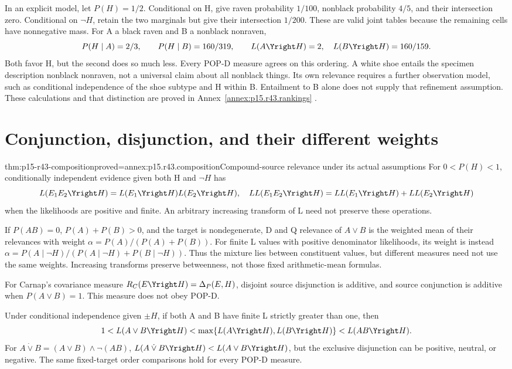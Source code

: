 In an explicit model, let \(P(H)=1/2\). Conditional on H, give raven
probability \(1/100\), nonblack probability \(4/5\), and their
intersection zero. Conditional on \(\neg H\), retain the two
marginals but give their intersection \(1/200\). These are valid
joint tables because the remaining cells have nonnegative mass.
For A a black raven and B a nonblack nonraven,
\[
 P(H\mid A)=2/3,
 \qquad P(H\mid B)=160/319,
 \qquad L(A\Yright H)=2,
 \quad L(B\Yright H)=160/159.
\]
Both favor H, but the second does so much less. Every POP-D measure
agrees on this ordering. A white shoe entails the specimen description
nonblack nonraven, not a universal claim about all nonblack things.
Its own relevance requires a further observation model, such as
conditional independence of the shoe subtype and H within B. Entailment
to B alone does not supply that refinement assumption. These calculations
and that distinction are proved in Annex~\ref{annex:p15.r43.rankings}
\parencite[pp.~271--272 and p.~274, nn.~15--16]{Merin2021Relevance}.

\section{Conjunction, disjunction, and their different weights}
\label{sec:p15-r43-composition}

\begin{hbtheorem}{thm:p15-r43-composition}{proved=annex:p15.r43.composition}{Compound-source relevance under its actual assumptions}
For \(0<P(H)<1\), conditionally independent evidence given both
H and \(\neg H\) has
\[
 L(E_1E_2\Yright H)=L(E_1\Yright H)L(E_2\Yright H),
 \quad LL(E_1E_2\Yright H)=LL(E_1\Yright H)+LL(E_2\Yright H)
\]
when the likelihoods are positive and finite. An arbitrary increasing
transform of L need not preserve these operations.

If \(P(AB)=0\), \(P(A)+P(B)>0\), and the target is nondegenerate,
D and Q relevance of \(A\vee B\) is the weighted mean of their
relevances with weight \(\alpha=P(A)/(P(A)+P(B))\).
For finite L values with positive denominator likelihoods, its weight
is instead \(\alpha=P(A\mid\neg H)/(P(A\mid\neg H)+P(B\mid\neg H))\).
Thus the mixture lies between constituent values, but different
measures need not use the same weights. Increasing transforms preserve
betweenness, not those fixed arithmetic-mean formulas.

For Carnap's covariance measure \(R_C(E\Yright H)=\Delta_P(E,H)\),
disjoint source disjunction is additive, and source conjunction is
additive when \(P(A\vee B)=1\). This measure does not obey POP-D.

Under conditional independence given \(\pm H\), if both A and B have
finite L strictly greater than one, then
\[
 1<L(A\vee B\Yright H)<\max\{L(A\Yright H),L(B\Yright H)\}
                   <L(AB\Yright H).
\]
For \(A\mathbin{\dot\vee}B=(A\vee B)\wedge\neg(AB)\),
\(L(A\mathbin{\dot\vee}B\Yright H)<L(A\vee B\Yright H)\),
but the exclusive disjunction can be positive, neutral, or negative.
The same fixed-target order comparisons hold for every POP-D measure.
\end{hbtheorem}

